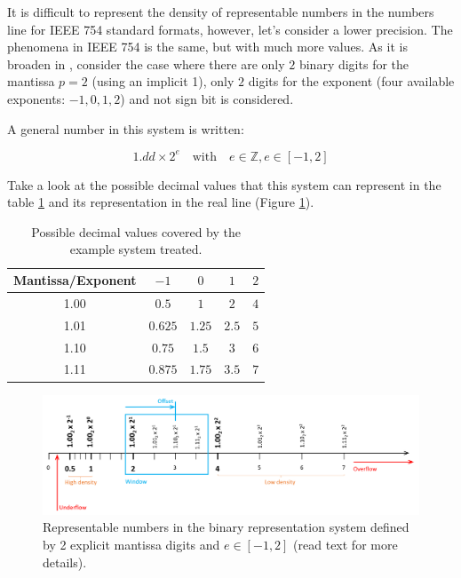 It is difficult to represent the density of representable numbers in the numbers line for IEEE 754 standard formats, 
however, let's consider a lower precision. The phenomena in IEEE 754 is the same, but with much more values.
As it is broaden in \cite{articleIEEE}, consider the case where there are only $2$ binary digits for the mantissa $p = 2$ (using an implicit 1),
only $2$ digits for the exponent (four available exponents: $-1, 0, 1, 2$) 
and not sign bit is considered.

A general number in this system is written: 

$$
1.dd \times 2^{e}    \quad \textrm{with}\quad e \in \mathbb{Z}, e\in\left[-1, 2\right] 
$$ 

Take a look at the possible decimal values that this system can represent in the table \ref{tab:PossibleValues} and its representation in the real line (Figure \ref{fig:DensityNumbers}). 

\begin{table}
    \centering
    \begin{tabular}{| c | c | c | c | c | }
        \hline
        Mantissa/Exponent   & $-1$ & $0$  & $1$  &   $2$  \\ \hline
        1.00                & $0.5$ & $1$  & $2$  &   $4$  \\ \hline
        1.01                & $0.625$ & $1.25$  & $2.5$  &   $5$  \\ \hline
        1.10                & $0.75$ & $1.5$  & $3$  &   $6$  \\ \hline
        1.11                & $0.875$ & $1.75$  & $3.5$  &   $7$  \\ \hline
    \end{tabular}
    \caption{Possible decimal values covered by the example system treated.}
    \label{tab:PossibleValues}
\end{table}

\begin{figure}[h]
    \centering
    \includegraphics[width= \textwidth]{./doc/Figures/DensityNumbers.png}
    \caption{Representable numbers in the binary representation system defined by 2 explicit mantissa digits and $e\in\left[-1, 2  \right]$ (read text for more details).}
    \label{fig:DensityNumbers}
\end{figure}





